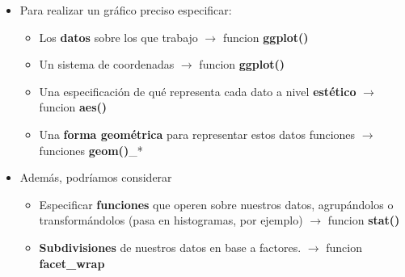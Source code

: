 \documentclass[
  10pt,
  ignorenonframetext,
]{beamer}
\providecommand{\tightlist}{%
  \setlength{\itemsep}{0pt}\setlength{\parskip}{0pt}}
\begin{document}
\begin{frame}{}
\protect\hypertarget{section-5}{}

\begin{itemize}
\item
  Para realizar un gráfico preciso especificar:

  \begin{itemize}
  \tightlist
  \item
    Los \textbf{datos} sobre los que trabajo \(\rightarrow\) funcion
    \textbf{ggplot()} \vspace{10pt}
  \item
    Un sistema de coordenadas \(\rightarrow\) funcion \textbf{ggplot()}
    \vspace{10pt}
  \item
    Una especificación de qué representa cada dato a nivel
    \textbf{estético} \(\rightarrow\) funcion \textbf{aes()}
    \vspace{10pt}
  \item
    Una \textbf{forma geométrica} para representar estos datos funciones
    \(\rightarrow\) funciones \textbf{geom()}\_* \vspace{10pt}
  \end{itemize}
\item
  Además, podríamos considerar \vspace{10pt}

  \begin{itemize}
  \tightlist
  \item
    Especificar \textbf{funciones} que operen sobre nuestros datos,
    agrupándolos o transformándolos (pasa en histogramas, por ejemplo)
    \(\rightarrow\) funcion \textbf{stat()} \vspace{10pt}
  \item
    \textbf{Subdivisiones} de nuestros datos en base a factores.
    \(\rightarrow\) funcion \textbf{facet\_wrap}
  \end{itemize}
\end{itemize}
\end{frame}
\end{document}
